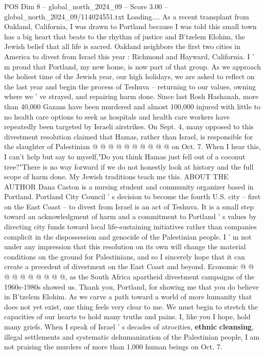 \begin{textsample}{POS Dim 8 – global\_north\_2024\_09 – Score 3.00 – global\_north\_2024\_09/114024551.txt}  \label{ex:f8_pos_299}
Loading....
As a recent transplant from Oakland, California, I was drawn to Portland because I was told this small town has a big heart that beats to the rhythm of justice and B'tzelem Elohim, the Jewish belief that all life is sacred.
Oakland neighbors the first two cities in America to divest from Israel this year : Richmond and Hayward, California.
I ' m proud that Portland, my new home, is now part of that group.
As we approach the holiest time of the Jewish year, our high holidays, we are asked to reflect on the last year and begin the process of Teshuva -- returning to our values, owning where we ' ve strayed, and repairing harm done.
Since last Rosh Hashanah, more than 40,000 Gazans have been murdered and almost 100,000 injured with little to no health care options to seek as hospitals and health care workers have repeatedly been targeted by Israeli airstrikes.
On Sept. 4, many opposed to this divestment resolution claimed that Hamas, rather than Israel, is responsible for the slaughter of Palestinian @ @ @ @ @ @ @ @ @ @ on Oct. 7.
When I hear this, I can't help but say to myself,"Do you think Hamas just fell out of a coconut tree?"There is no way forward if we do not honestly look at history and the full scope of harm done.
My Jewish traditions teach me this.
ABOUT THE AUTHOR Dana Caston is a nursing student and community organizer based in Portland.
Portland City Council ' s decision to become the fourth U.S. city -- first on the East Coast -- to divest from Israel is an act of Teshuva.
It is a small step toward an acknowledgment of harm and a commitment to Portland ' s values by directing city funds toward local life-sustaining initiatives rather than companies complicit in the dispossession and genocide of the Palestinian people.
I ' m not under any impression that this resolution on its own will change the material conditions on the ground for Palestinians, and so I sincerely hope that it can create a precedent of divestment on the East Coast and beyond.
Economic @ @ @ @ @ @ @ @ @ @, as the South Africa apartheid divestment campaigns of the 1960s-1980s showed us.
Thank you, Portland, for showing me that you do believe in B'tzelem Elohim.
As we carve a path toward a world of more humanity that does not yet exist, one thing feels very clear to me.
We must begin to stretch the capacities of our hearts to hold many truths and pains.
I, like you I hope, hold many griefs.
When I speak of Israel ' s decades of atrocities, \textbf{ethnic} \textbf{cleansing}, illegal settlements and systematic dehumanization of the Palestinian people, I am not praising the murders of more than 1,000 human beings on Oct. 7.

\end{textsample}
